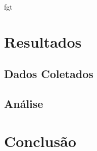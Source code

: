 fgt\documentclass[12pt, %
openright, 
oneside, %
a4paper,    %
brazil]{facom-ufu-abntex2}
\begin{document}
\chapter{Resultados}
\section{Dados Coletados}
\section{Análise}

\chapter{Conclusão}




\postextual









\end{document}
